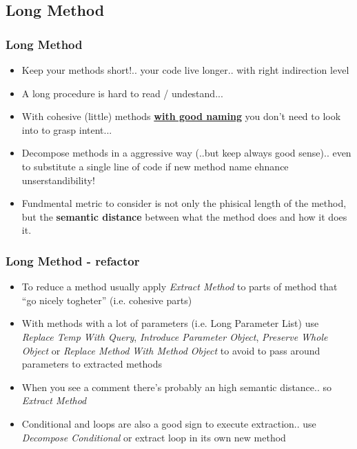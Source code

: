 \documentclass{beamer}
\begin{document}
\subsection{Long Method}
\begin{frame}
  \frametitle{Long Method}
  \begin{itemize}
	\item<+-> Keep your methods short!.. your code live longer.. with right indirection level 
	\item<+-> A long procedure is hard to read / undestand...
	\item<+-> With cohesive (little) methods \underline{\textbf{with good naming}} you don't need to look into to grasp intent...
	\item<+-> Decompose methods in a aggressive way (..but keep always good sense).. even to substitute a single line of code if new method name ehnance unserstandibility!
	\item<+-> Fundmental metric to consider is not only the phisical length of the method, but the \textbf{semantic distance} between what the method does and how it does it.
  \end{itemize}
\end{frame}


\begin{frame}
  \frametitle{Long Method - refactor}
  \begin{itemize}
	\item<+-> To reduce a method usually apply \textit{Extract Method} to parts of method that ``go nicely togheter'' (i.e. cohesive parts) 
	\item<+-> With methods with a lot of parameters (i.e. Long Parameter List) use \textit{Replace Temp With Query}, \textit{Introduce Parameter Object}, \textit{Preserve Whole Object} or \textit{Replace Method With Method Object} to avoid to pass around parameters to extracted methods
	\item<+-> When you see a comment there's probably an high semantic distance.. so \textit{Extract Method}  
	\item<+-> Conditional and loops are also a good sign to execute extraction.. use \textit{Decompose Conditional} or extract loop in its own new method
  \end{itemize}
\end{frame}
\end{document}
